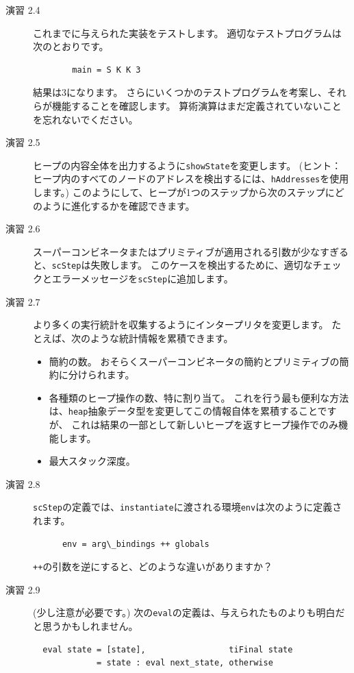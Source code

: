 \documentclass{jbook}
\begin{document}
\begin{description}
	\item [演習 2.4] これまでに与えられた実装をテストします。
	      適切なテストプログラムは次のとおりです。

	      \begin{verbatim}
        main = S K K 3
\end{verbatim}

	      結果は3になります。
	      さらにいくつかのテストプログラムを考案し、それらが機能することを確認します。
	      算術演算はまだ定義されていないことを忘れないでください。
	\item [演習 2.5] ヒープの内容全体を出力するように\texttt{showState}を変更します。
	      (ヒント：ヒープ内のすべてのノードのアドレスを検出するには、\texttt{hAddresses}を使用します。)
	      このようにして、ヒープが1つのステップから次のステップにどのように進化するかを確認できます。
	\item [演習 2.6] スーパーコンビネータまたはプリミティブが適用される引数が少なすぎると、\texttt{scStep}は失敗します。
	      このケースを検出するために、適切なチェックとエラーメッセージを\texttt{scStep}に追加します。
	\item [演習 2.7] より多くの実行統計を収集するようにインタープリタを変更します。
	      たとえば、次のような統計情報を累積できます。

	      \begin{itemize}
		      \item 簡約の数。
		            おそらくスーパーコンビネータの簡約とプリミティブの簡約に分けられます。
		      \item 各種類のヒープ操作の数、特に割り当て。
		            これを行う最も便利な方法は、\texttt{heap}抽象データ型を変更してこの情報自体を累積することですが、
		            これは結果の一部として新しいヒープを返すヒープ操作でのみ機能します。
		      \item 最大スタック深度。
	      \end{itemize}

	\item [演習 2.8] \texttt{scStep}の定義では、\texttt{instantiate}に渡される環境\texttt{env}は次のように定義されます。

	      \begin{verbatim}
      env = arg\_bindings ++ globals
\end{verbatim}

	      \texttt{++}の引数を逆にすると、どのような違いがありますか？
	\item [演習 2.9] (少し注意が必要です。)
	      次の\texttt{eval}の定義は、与えられたものよりも明白だと思うかもしれません。
	      \begin{verbatim}
  eval state = [state],                 tiFinal state
             = state : eval next_state, otherwise
\end{verbatim}


\end{description}
\end{document}
